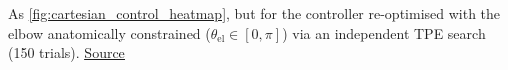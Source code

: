 As \autoref{fig:cartesian_control_heatmap}, but for the controller re-optimised with the elbow anatomically constrained ($\theta_\mathrm{el} \in [0, \pi]$) via an independent TPE search (150 trials). \href{https://github.com/tahmidazam/gg4/blob/main/notebooks/cartesian_control_constrained_heatmap/cartesian_control_constrained_heatmap.ipynb}{\underline{Source}}%